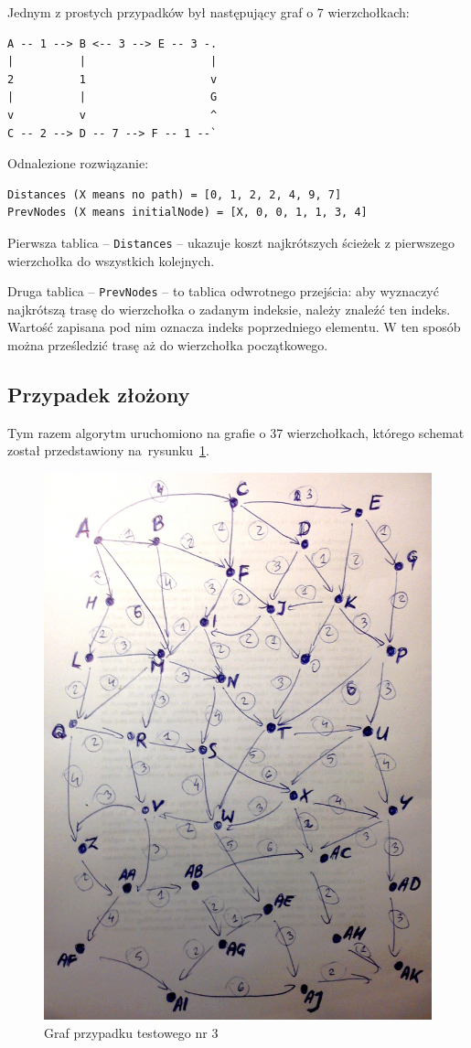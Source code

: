 \documentclass{article}
\begin{document}
Jednym z prostych przypadków był następujący graf o 7 wierzchołkach:

\begin{lstlisting}
A -- 1 --> B <-- 3 --> E -- 3 -.
|          |                   |
2          1                   v
|          |                   G
v          v                   ^
C -- 2 --> D -- 7 --> F -- 1 --`
\end{lstlisting}

Odnalezione rozwiązanie:

\begin{lstlisting}
Distances (X means no path) = [0, 1, 2, 2, 4, 9, 7]
PrevNodes (X means initialNode) = [X, 0, 0, 1, 1, 3, 4] 
\end{lstlisting}

Pierwsza tablica -- \texttt{Distances} -- ukazuje koszt najkrótszych ścieżek z pierwszego wierzchołka do wszystkich kolejnych.

Druga tablica -- \texttt{PrevNodes} -- to tablica odwrotnego przejścia: aby wyznaczyć najkrótszą trasę do wierzchołka o zadanym indeksie, należy znaleźć ten indeks. Wartość zapisana pod nim oznacza indeks poprzedniego elementu. W ten sposób można prześledzić trasę aż do wierzchołka początkowego.

\clearpage

\subsection{Przypadek złożony}

Tym razem algorytm uruchomiono na grafie o 37 wierzchołkach, którego schemat został przedstawiony na~rysunku~\ref{testcase3}. 

\begin{figure}[!h]
	\centering
	\includegraphics[width=.55\textwidth]{res/testcase3}
	\caption{Graf przypadku testowego nr 3}
	\label{testcase3}
\end{figure}
\end{document}
